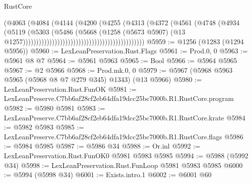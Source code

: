 \begin{lexlean}{RustCore}
\begin{coremodule}
                                                                (@4063
                                                                  (@4084
                                                                    (@4144
                                                                      (@4200
                                                                        (@4255
                                                                          (@4313
                                                                            (@4372
                                                                              (@4561
                                                                                (@4748
                                                                                  (@4934
                                                                                    (@5119
                                                                                      (@5303
                                                                                        (@5486
                                                                                          (@5668
                                                                                            (@1258
                                                                                              (@5673
                                                                                                @5907)
                                                                                              (@13
                                                                                                @1257))))))))))))))))))))))))))))))))))))))))))))))
@5959 := @1256 (@1283 (@1294 @5956))
@5960 := LexLeanPreservation.Rust.Flags
@5961 := Prod.{0, 0}
@5963 := @5961 @8 @7
@5964 := @5961 @5963
@5965 := Bool
@5966 := @5964 @5965
@5967 := @2 @5966
@5968 := Prod.mk.{0, 0}
@5979 := @5967 (@5968 @5963 @5965 (@5968 @8 @7 @279 @345) @1343) (@13 @5966)
@5980 := LexLeanPreservation.Rust.FunOK
@5981 := LexLeanPreserve.C7bb6af28cf2eb64dfa19dcc25bc7000b.R1.RustCore.program
@5982 := @5980 @5981
@5983 := LexLeanPreserve.C7bb6af28cf2eb64dfa19dcc25bc7000b.R1.RustCore.krate
@5984 := @5982 @5983
@5985 := LexLeanPreserve.C7bb6af28cf2eb64dfa19dcc25bc7000b.R1.RustCore.flags
@5986 := @5984 @5985
@5987 := @5986 @34
@5988 := Or.inl
@5992 := LexLeanPreservation.Rust.FunOK0 @5981 @5983 @5985
@5994 := @5988 (@5992 @34)
@5998 := LexLeanPreservation.Rust.FunLoop @5981 @5983 @5985
@6000 := @5994 (@5998 @34)
@6001 := Exists.intro.{1}
@6002 := @6001 @60

\end{coremodule}
\end{lexlean}
